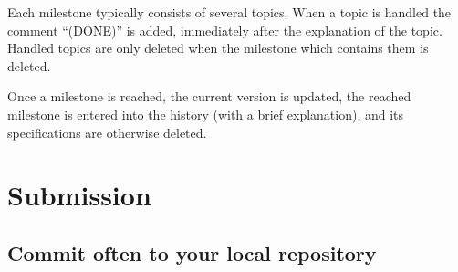 \documentclass{book}
\begin{document}
Each milestone typically consists of several topics. When a topic is handled the comment ``(DONE)'' is added, immediately after the explanation of the topic. Handled topics are only deleted when the milestone which contains them is deleted.

Once a milestone is reached, the current version is updated, the reached milestone is entered into the history (with a brief explanation), and its specifications are otherwise deleted.




\chapter{Submission}
\label{cha:Submission}

\section{Commit often to your local repository}
\label{sec:Submitoften}
\end{document}
